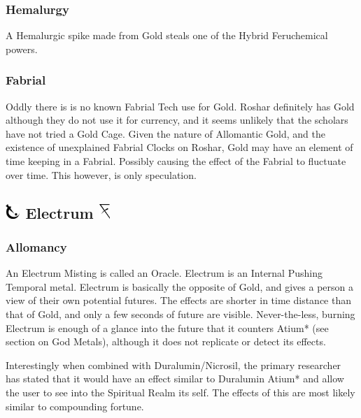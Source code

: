 \documentclass[conference]{IEEEtran}
\begin{document}
\subsubsection*{\textbf{Hemalurgy}}
A Hemalurgic spike made from Gold steals one of the Hybrid Feruchemical powers.\cite{HE-TB} \\
\subsubsection*{\textbf{Fabrial}}
Oddly there is is no known Fabrial Tech use for Gold.  Roshar definitely has Gold although they do not use it for currency,\cite{OB-CH44} and it seems unlikely that the scholars have not tried a Gold Cage.  Given the nature of Allomantic Gold, and the existence of unexplained Fabrial Clocks on Roshar,\cite{WoR-CH12} Gold may have an element of time keeping in a Fabrial.  Possibly causing the effect of the Fabrial to fluctuate over time.  This however, is only speculation.


\newpage
\subsection*{\includegraphics[height=1em]{images/Electrum.png}  \textbf{Electrum} \includegraphics[height=1em]{images/Electrum_(Feruchemy).png}}
\subsubsection*{\textbf{Allomancy}}
An Electrum Misting is called an Oracle.\cite{ARS}  Electrum is an Internal Pushing Temporal metal.\cite{AL-TB}  Electrum is basically the opposite of Gold, and gives a person a view of their own potential futures.\cite{ARS}  The effects are shorter in time distance than that of Gold, and only a few seconds of future are visible.  Never-the-less, burning Electrum is enough of a glance into the future that it counters Atium*\cite{HoA-CH3} (see section on God Metals), although it does not replicate or detect its effects.\cite{HoA-CH5}

Interestingly when combined with Duralumin/Nicrosil, the primary researcher has stated that it would have an effect similar to Duralumin Atium*\cite{HoA-CH81} and allow the user to see into the Spiritual Realm its self.\cite{enhanced-nicrosil}  The effects of this are most likely similar to compounding fortune.\\
\end{document}

